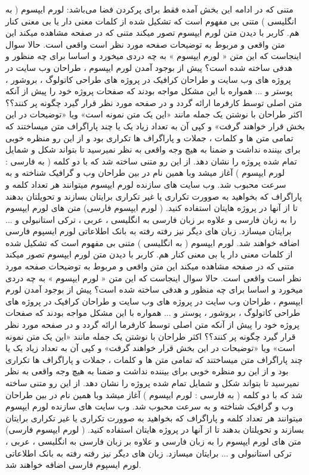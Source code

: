 متنی که در ادامه این بخش آمده فقط برای پرکردن فضا می‌باشد: لورم ایپسوم ( به انگلیسی  ) متنی بی مفهوم است که تشکیل شده از کلمات معنی دار یا بی معنی کنار هم. کاربر با دیدن متن لورم ایپسوم تصور میکند متنی که در صفحه مشاهده میکند این متن واقعی و مربوط به توضیحات صفحه مورد نظر است واقعی است. حالا سوال اینجاست که این متن « لورم ایپسوم » به چه دردی میخورد و اساسا برای چه منظور و هدفی ساخته شده است؟ پیش از بوجود آمدن لورم ایپسوم ، طراحان وب سایت در پروژه های وب سایت و طراحان کرافیک در پروژه های طراحی کاتولوگ ، بروشور ، پوستر و ... همواره با این مشکل مواجه بودند که صفحات پروژه خود را پیش از آنکه متن اصلی توسط کارفرما ارائه گردد و در صفحه مورد نظر قرار گیرد چگونه پر کنند؟؟ اکثر طراحان با نوشتن یک جمله مانند «این یک متن نمونه است» ویا «توضیحات در این بخش قرار خواهند گرفت» و کپی آن به تعداد زیاد یک یا چند پاراگراف متن میساختند که تمامی متن ها و کلمات ، جملات و پاراگراف ها تکراری بود و از این رو منظره خوبی برای بیننده نداشت و ضمنا به هیچ وجه واقعی به نظر نمیرسید تا بتواند شکل و شمایل تمام شده پروژه را نشان دهد. از این رو متنی ساخته شد که با دو کلمه ( به فارسی : لورم ایپسوم ) آغاز میشد وبا همین نام در بین طراحان وب و گرافیک شناخته و به سرعت محبوب شد. وب سایت های سازنده لورم ایپسوم میتوانند هر تعداد کلمه و پاراگراف که بخواهید به صوورت تکراری یا غیر تکراری برایتان بسازند و تحویلتان بدهند تا از آنها در پروژه هایتان استفاده کنید. ( لورم ایپسوم فارسی) متن های لورم ایپسوم را به زبان فارسی و علاوه بر زبان فارسی به انگلیسی ، عربی ، ترکی استانبولی و ... برایتان میسازد. زبان های دیگر نیز رفته رفته به بانک اطلاعاتی لورم ایسپوم فارسی اضافه خواهند شد.  لورم ایپسوم ( به انگلیسی  ) متنی بی مفهوم است که تشکیل شده از کلمات معنی دار یا بی معنی کنار هم. کاربر با دیدن متن لورم ایپسوم تصور میکند متنی که در صفحه مشاهده میکند این متن واقعی و مربوط به توضیحات صفحه مورد نظر است واقعی است. حالا سوال اینجاست که این متن « لورم ایپسوم » به چه دردی میخورد و اساسا برای چه منظور و هدفی ساخته شده است؟ پیش از بوجود آمدن لورم ایپسوم ، طراحان وب سایت در پروژه های وب سایت و طراحان کرافیک در پروژه های طراحی کاتولوگ ، بروشور ، پوستر و ... همواره با این مشکل مواجه بودند که صفحات پروژه خود را پیش از آنکه متن اصلی توسط کارفرما ارائه گردد و در صفحه مورد نظر قرار گیرد چگونه پر کنند؟؟ اکثر طراحان با نوشتن یک جمله مانند «این یک متن نمونه است» ویا «توضیحات در این بخش قرار خواهند گرفت» و کپی آن به تعداد زیاد یک یا چند پاراگراف متن میساختند که تمامی متن ها و کلمات ، جملات و پاراگراف ها تکراری بود و از این رو منظره خوبی برای بیننده نداشت و ضمنا به هیچ وجه واقعی به نظر نمیرسید تا بتواند شکل و شمایل تمام شده پروژه را نشان دهد. از این رو متنی ساخته شد که با دو کلمه ( به فارسی : لورم ایپسوم ) آغاز میشد وبا همین نام در بین طراحان وب و گرافیک شناخته و به سرعت محبوب شد. وب سایت های سازنده لورم ایپسوم میتوانند هر تعداد کلمه و پاراگراف که بخواهید به صوورت تکراری یا غیر تکراری برایتان بسازند و تحویلتان بدهند تا از آنها در پروژه هایتان استفاده کنید. ( لورم ایپسوم فارسی) متن های لورم ایپسوم را به زبان فارسی و علاوه بر زبان فارسی به انگلیسی ، عربی ، ترکی استانبولی و ... برایتان میسازد. زبان های دیگر نیز رفته رفته به بانک اطلاعاتی لورم ایسپوم فارسی اضافه خواهند شد.  


